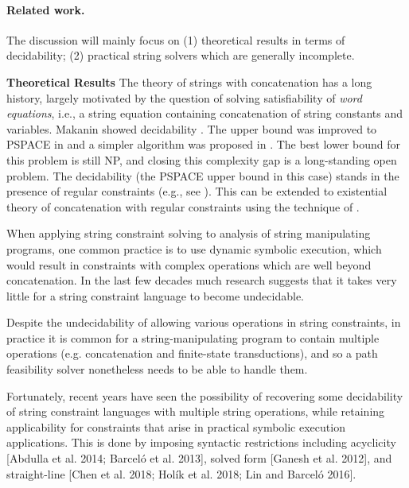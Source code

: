 
%
%
%
%
%
%

\paragraph*{Related work.}
The discussion will mainly focus on (1) theoretical results in terms of decidability; %
(2) practical string solvers which are generally incomplete.  %

\smallskip 
\noindent\textbf{Theoretical Results}
The theory of strings with concatenation has a long history, largely motivated by %
the question of solving satisfiability of \emph{word equations}, i.e., a string equation containing concatenation of string constants and variables. Makanin showed decidability \cite{Makanin}. The upper bound was improved to PSPACE in \cite{P04} and  %
a simpler algorithm was proposed in \cite{J17}. %
The best lower bound for this problem is still NP, and closing this complexity gap is a long-standing open problem. %
The decidability (the PSPACE upper bound in this case) stands %
in the presence of regular constraints (e.g., see \cite{Schulz}). This can be extended to existential theory
of concatenation with regular constraints using the technique of \cite{buchi}.

When applying string constraint solving to analysis of string manipulating programs, one common practice is to use dynamic symbolic execution, which would result in constraints with complex operations which are well beyond concatenation. In the last few decades much research suggests that it takes very little for a string constraint language to become undecidable. 

Despite the undecidability of allowing various operations in string constraints, in practice it
is common for a string-manipulating program to contain multiple operations (e.g. concatenation
and finite-state transductions), and so a path feasibility solver nonetheless needs to be able to
handle them.

Fortunately, recent years have seen the possibility of recovering some decidability of string constraint
languages with multiple string operations, while retaining applicability for constraints that
arise in practical symbolic execution applications. This is done by imposing syntactic restrictions
including acyclicity [Abdulla et al. 2014; Barceló et al. 2013], solved form [Ganesh et al. 2012], and
straight-line [Chen et al. 2018; Holík et al. 2018; Lin and Barceló 2016]. 

